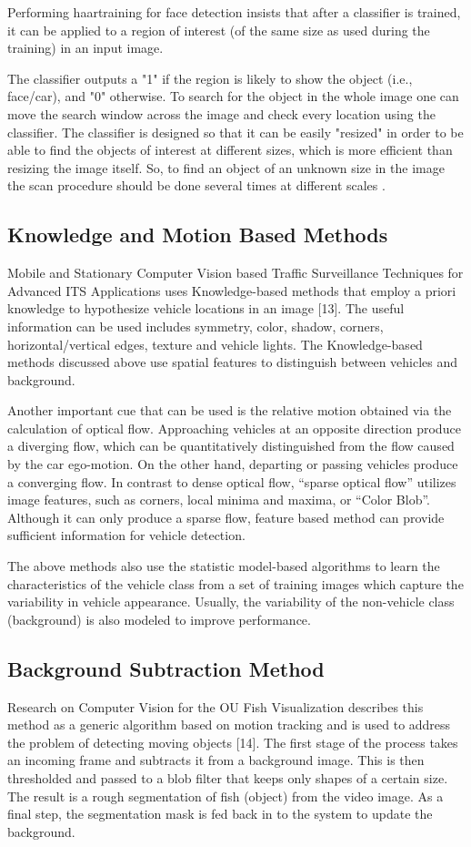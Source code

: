 Performing haartraining for face detection insists that after a classifier is trained, it can be applied to a region of interest (of the same size as used during the training) in an input image. 

The classifier outputs a "1" if the region is likely to show the object (i.e., face/car), and "0" otherwise. To search for the object in the whole image one can move the search window across the image and check every location using the classifier. The classifier is designed so that it can be easily "resized" in order to be able to find the objects of interest at different sizes, which is more efficient than resizing the image itself. So, to find an object of an unknown size in the image the scan procedure should be done several times at different scales  \cite{turner}. 

\subsection{Knowledge and Motion Based Methods}
Mobile and Stationary Computer Vision based Traffic Surveillance Techniques for Advanced ITS Applications uses Knowledge-based methods that employ a priori knowledge to hypothesize vehicle locations in an image [13]. The useful information can be used includes symmetry, color, shadow, corners, horizontal/vertical edges, texture and vehicle lights. The Knowledge-based methods discussed above use spatial features to distinguish between vehicles and background. 

Another important cue that can be used is the relative motion obtained via the calculation of optical flow. Approaching vehicles at an opposite direction produce a diverging flow, which can be quantitatively distinguished from the flow caused by the car ego-motion. On the other hand, departing or passing vehicles produce a converging flow. In contrast to dense optical flow, “sparse optical flow” utilizes image features, such as corners, local minima and maxima, or “Color Blob”. Although it can only produce a sparse flow, feature based method can provide sufficient information for vehicle detection. 

The above methods also use the statistic model-based algorithms to learn the characteristics of the vehicle class from a set of training images which capture the variability in vehicle appearance. Usually, the variability of the non-vehicle class (background) is also modeled to improve performance.

\subsection{Background Subtraction Method}
Research on Computer Vision for the OU Fish Visualization describes this method as a generic algorithm based on motion tracking and is used to address the problem of detecting moving objects [14]. The first stage of the process takes an incoming frame and subtracts it from a background image. This is then thresholded and passed to a blob filter that keeps only shapes of a certain size. The result is a rough segmentation of fish (object) from the video image. As a final step, the segmentation mask is fed back in to the system to update the background. 

